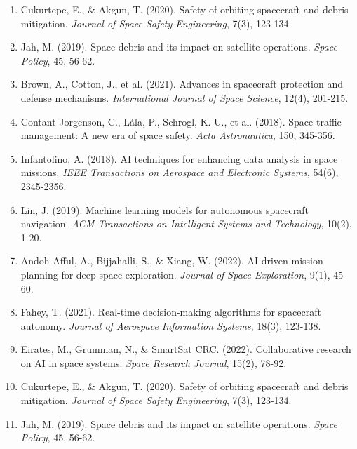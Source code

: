 \documentclass[a4paper,12pt]{article}
\begin{document}
\begin{enumerate}
    \item Cukurtepe, E., \& Akgun, T. (2020). Safety of orbiting spacecraft and debris mitigation. \textit{Journal of Space Safety Engineering}, 7(3), 123-134.
    
    \item Jah, M. (2019). Space debris and its impact on satellite operations. \textit{Space Policy}, 45, 56-62.
    
    \item Brown, A., Cotton, J., et al. (2021). Advances in spacecraft protection and defense mechanisms. \textit{International Journal of Space Science}, 12(4), 201-215.
    
    \item Contant-Jorgenson, C., Lála, P., Schrogl, K.-U., et al. (2018). Space traffic management: A new era of space safety. \textit{Acta Astronautica}, 150, 345-356.
    
    \item Infantolino, A. (2018). AI techniques for enhancing data analysis in space missions. \textit{IEEE Transactions on Aerospace and Electronic Systems}, 54(6), 2345-2356.
    
    \item Lin, J. (2019). Machine learning models for autonomous spacecraft navigation. \textit{ACM Transactions on Intelligent Systems and Technology}, 10(2), 1-20.
    
    \item Andoh Afful, A., Bijjahalli, S., \& Xiang, W. (2022). AI-driven mission planning for deep space exploration. \textit{Journal of Space Exploration}, 9(1), 45-60.
    
    \item Fahey, T. (2021). Real-time decision-making algorithms for spacecraft autonomy. \textit{Journal of Aerospace Information Systems}, 18(3), 123-138.
    
    \item Eirates, M., Grumman, N., \& SmartSat CRC. (2022). Collaborative research on AI in space systems. \textit{Space Research Journal}, 15(2), 78-92.
    
    \item Cukurtepe, E., \& Akgun, T. (2020). Safety of orbiting spacecraft and debris mitigation. \textit{Journal of Space Safety Engineering}, 7(3), 123-134.
    
    \item Jah, M. (2019). Space debris and its impact on satellite operations. \textit{Space Policy}, 45, 56-62.
    

\end{enumerate}
\end{document}
